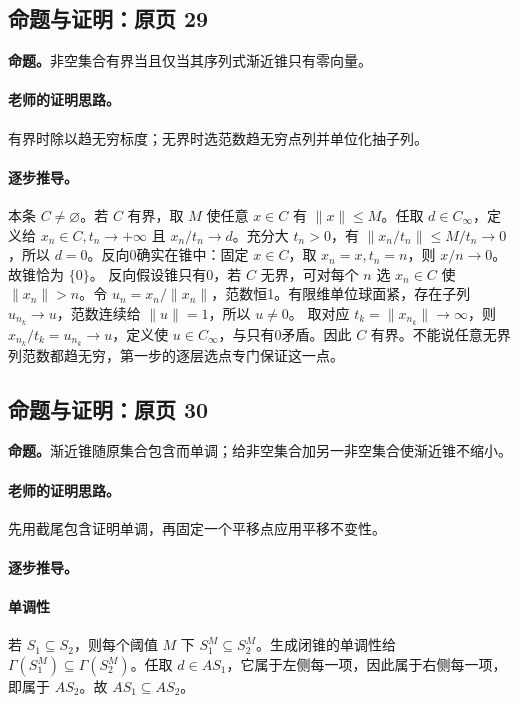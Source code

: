 \subsection{命题与证明：原页 29}

\textbf{命题。}非空集合有界当且仅当其序列式渐近锥只有零向量。

\paragraph{老师的证明思路。}有界时除以趋无穷标度；无界时选范数趋无穷点列并单位化抽子列。

\paragraph{逐步推导。}
本条 $C\ne\varnothing$。若 $C$ 有界，取 $M$ 使任意 $x\in C$ 有 $\|x\|\le M$。任取 $d\in C_\infty$，定义给 $x_n\in C,t_n\to+\infty$ 且 $x_n/t_n\to d$。充分大 $t_n>0$，有 $\|x_n/t_n\|\le M/t_n\to0$，所以 $d=0$。反向0确实在锥中：固定 $x\in C$，取 $x_n=x,t_n=n$，则 $x/n\to0$。故锥恰为 $\{0\}$。
反向假设锥只有0，若 $C$ 无界，可对每个 $n$ 选 $x_n\in C$ 使 $\|x_n\|>n$。令 $u_n=x_n/\|x_n\|$，范数恒1。有限维单位球面紧，存在子列 $u_{n_k}\to u$，范数连续给 $\|u\|=1$，所以 $u\ne0$。
取对应 $t_k=\|x_{n_k}\|\to\infty$，则 $x_{n_k}/t_k=u_{n_k}\to u$，定义使 $u\in C_\infty$，与只有0矛盾。因此 $C$ 有界。不能说任意无界列范数都趋无穷，第一步的逐层选点专门保证这一点。


\subsection{命题与证明：原页 30}

\textbf{命题。}渐近锥随原集合包含而单调；给非空集合加另一非空集合使渐近锥不缩小。

\paragraph{老师的证明思路。}先用截尾包含证明单调，再固定一个平移点应用平移不变性。

\paragraph{逐步推导。}
\paragraph{单调性}若 $S_1\subseteq S_2$，则每个阈值 $M$ 下 $S_1^M\subseteq S_2^M$。生成闭锥的单调性给 $\Gamma(S_1^M)\subseteq\Gamma(S_2^M)$。任取 $d\in AS_1$，它属于左侧每一项，因此属于右侧每一项，即属于 $AS_2$。故 $AS_1\subseteq AS_2$。
